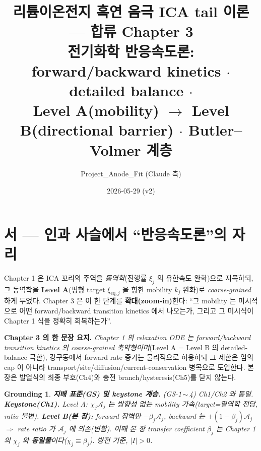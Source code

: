 \documentclass[11pt,a4paper]{article}
\title{\textbf{리튬이온전지 흑연 음극 ICA tail 이론 — 합류 Chapter 3}\\[0.4em]
\large 전기화학 반응속도론: forward/backward kinetics $\cdot$ detailed balance $\cdot$\\
Level A(mobility) $\to$ Level B(directional barrier) $\cdot$ Butler--Volmer 계층}
\author{Project\_Anode\_Fit (Claude 측)}
\date{2026-05-29 (v2)}
\newtheorem*{groundingbox}{Grounding}
\newcommand{\eq}{\mathrm{eq}}
\begin{document}
\maketitle

\section*{서 — 인과 사슬에서 ``반응속도론''의 자리}
Chapter 1 은 ICA 꼬리의 주역을 \emph{동역학}(진행률 $\xi_j$ 의 유한속도 완화)으로 지목하되, 그 동역학을
\textbf{Level A}(평형 target $\xi_{\eq,j}$ 을 향한 mobility $k_j$ 완화)로 \emph{coarse-grained} 하게 두었다.
Chapter 3 은 이 한 단계를 \textbf{확대(zoom-in)}한다: ``그 mobility 는 미시적으로 어떤 forward/backward
transition kinetics 에서 나오는가, 그리고 그 미시식이 Chapter 1 식을 정확히 회복하는가''.

\textbf{Chapter 3 의 한 문장 요지.} \emph{Chapter 1 의 relaxation ODE 는 forward/backward transition
kinetics 의 coarse-grained 축약형이며}(Level A = Level B 의 detailed-balance 극한), 강구동에서 forward rate
증가는 물리적으로 허용하되 그 제한은 임의 cap 이 아니라 transport/site/diffusion/current-conservation 병목으로
도입한다. 본 장은 발열식의 최종 부호(Ch4)와 충전 branch/hysteresis(Ch5)를 닫지 않는다.

\begin{groundingbox}
\textbf{지배 표준(GS) 및 keystone 계승.} (GS-1\,$\sim$\,4) Ch1/Ch2 와 동일. \textbf{Keystone(Ch1).} Level A:
$\chi_j\mathcal A_j$ 는 \emph{방향성 없는} mobility 가속(target=열역학 전담, ratio 불변). \textbf{Level B(본 장):}
forward 장벽만 $-\beta_j\mathcal A_j$, backward 는 $+(1-\beta_j)\mathcal A_j$ $\Rightarrow$ rate ratio 가
$\mathcal A_j$ 에 의존(변함). 이때 본 장 transfer coefficient $\beta_j$ 는 Chapter 1 의 $\chi_j$ 와
\textbf{동일물}이다($\chi_j\equiv\beta_j$). 방전 기준, $|I|>0$.
\end{groundingbox}

\tableofcontents
\newpage

\end{document}
